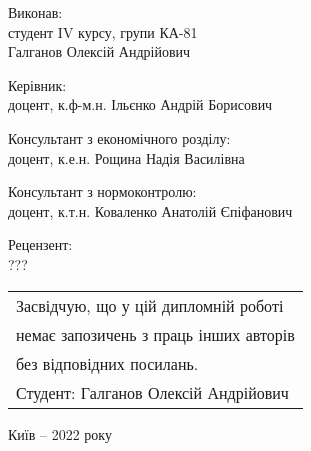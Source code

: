 \begin{flushleft}
    {
        Виконав:\\
        студент IV курсу, групи КА-81\\
        Галганов Олексій Андрійович
    
    }

    \vspace{5mm}
    {
        Керівник:\\
        доцент, к.ф-м.н. Ільєнко Андрій Борисович
    
    }

    \vspace{5mm}
    {
        Консультант з економічного розділу:\\
        доцент, к.е.н. Рощина Надія Василівна

        
    }

    \vspace{5mm}
    {        
        Консультант з нормоконтролю:\\
        доцент, к.т.н. Коваленко Анатолій Єпіфанович
        
    }

    \vspace{5mm}
    {
        Рецензент: \\
        ???
        
    }

\end{flushleft}

\begin{flushright}
    \begin{tabular}{l@{}}
        \renewcommand{\baselineskip}{1.0}
        Засвідчую, що у цій дипломній роботі\\
        немає запозичень з праць інших авторів\\
        без відповідних посилань.\\
        Студент: Галганов Олексій Андрійович
  \end{tabular}
\end{flushright}

\begin{center}
    \vspace{10mm}
    Київ -- 2022 року
\end{center}
\newpage